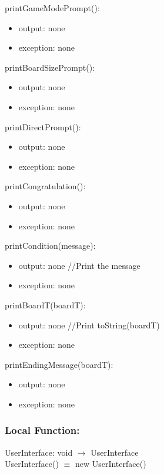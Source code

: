 \documentclass[12pt]{article}
\begin{document}
\noindent printGameModePrompt():
\begin{itemize}
  \item output: none
  \item exception: none
\end{itemize}

\noindent printBoardSizePrompt():
\begin{itemize}
  \item output: none
  \item exception: none
\end{itemize}

\noindent printDirectPrompt():
\begin{itemize}
  \item output: none
  \item exception: none
\end{itemize}

\noindent printCongratulation():
\begin{itemize}
  \item output: none
  \item exception: none
\end{itemize}

\noindent printCondition(message):
\begin{itemize}
  \item output: none  //Print the message
  \item exception: none
\end{itemize}

\noindent printBoardT(boardT):
\begin{itemize}
  \item output: none  //Print toString(boardT)
  \item exception: none
\end{itemize}

\noindent printEndingMessage(boardT):
\begin{itemize}
  \item output: none
  \item exception: none
\end{itemize}

\subsubsection*{Local Function:}

\noindent UserInterface: void $\rightarrow$ UserInterface \\
UserInterface() $\equiv$ new UserInterface()\\
\end{document}
